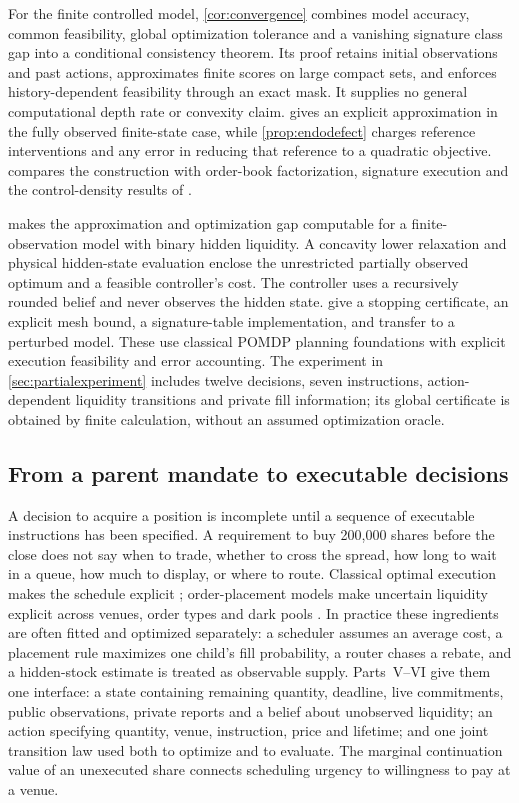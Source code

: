 \documentclass[11pt]{article}
\numberwithin{equation}{section}
\theoremstyle{definition}
\theoremstyle{remark}
\theoremstyle{definition}
\begin{document}
For the finite controlled model, \cref{cor:convergence} combines model
accuracy, common feasibility, global optimization tolerance and a vanishing
signature class gap into a conditional consistency theorem. Its proof
retains initial observations and past actions, approximates finite scores on
large compact sets, and enforces history-dependent feasibility through an
exact mask. It supplies no general computational depth rate or convexity
claim.  gives an explicit approximation in the fully
observed finite-state case, while \cref{prop:endodefect} charges reference
interventions and any error in reducing that reference to a quadratic
objective.  compares the construction with order-book
factorization, signature execution and the control-density results of
\citet{bank2025signatures}.

 makes the approximation and optimization gap
computable for a finite-observation model with binary hidden liquidity.
A concavity lower relaxation and physical hidden-state evaluation enclose
the unrestricted partially observed optimum and a feasible controller's cost.
The controller uses a recursively rounded belief and never observes the
hidden state. 
give a stopping certificate, an explicit mesh bound, a signature-table
implementation, and transfer to a perturbed model. These use classical
POMDP planning foundations with explicit execution feasibility and error
accounting. The experiment in \cref{sec:partialexperiment} includes twelve
decisions, seven instructions, action-dependent liquidity transitions and
private fill information; its global certificate is obtained by finite
calculation, without an assumed optimization oracle.

\subsection{From a parent mandate to executable decisions}\label{sec:intro-mandate}
A decision to acquire a position is incomplete until a sequence of executable
instructions has been specified. A requirement to buy 200{,}000 shares before
the close does not say when to trade, whether to cross the spread, how long to
wait in a queue, how much to display, or where to route. Classical optimal
execution makes the schedule explicit \citep{bertsimaslo1998,almgren2001};
order-placement models make uncertain liquidity explicit across venues, order
types and dark pools
\citep{cont2017,cartea2015,kratz2015,huang2015}.
In practice these ingredients are often fitted and optimized separately: a
scheduler assumes an average cost, a placement rule maximizes one child's fill
probability, a router chases a rebate, and a hidden-stock estimate is treated
as observable supply. Parts~V--VI give them one interface: a state containing
remaining quantity, deadline, live commitments, public observations, private
reports and a belief about unobserved liquidity; an action specifying quantity,
venue, instruction, price and lifetime; and one joint transition law used both
to optimize and to evaluate. The marginal continuation value of an unexecuted
share connects scheduling urgency to willingness to pay at a venue.
\end{document}
